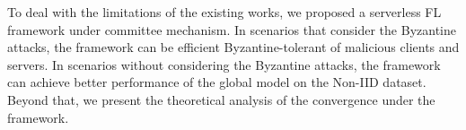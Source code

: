 \documentclass[10pt,journal,compsoc]{IEEEtran}
\newcommand{\etal}{\emph{et al.} }
\begin{document}

To deal with the limitations of the existing works, we proposed a serverless FL framework under committee mechanism. In scenarios that consider the Byzantine attacks, the framework can be efficient Byzantine-tolerant of malicious clients and servers. In scenarios without considering the Byzantine attacks, the framework can achieve better performance of the global model on the Non-IID dataset. Beyond that, we present the theoretical analysis of the convergence under the framework.

\end{document}
